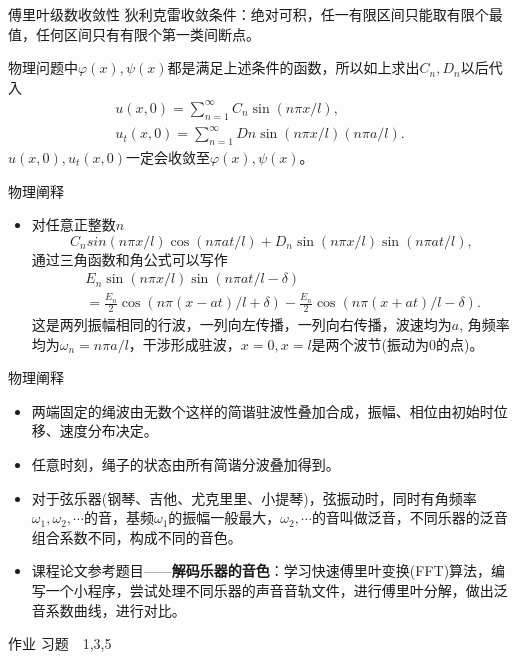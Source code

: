 \documentclass[11pt]{beamer}
\newcommand{\kong}[1][0.5]{\vspace{#1cm}}
\begin{document}
\begin{frame}{傅里叶级数收敛性}
狄利克雷收敛条件：绝对可积，任一有限区间只能取有限个最值，任何区间只有有限个第一类间断点。

\kong[1]
物理问题中$\varphi(x), \psi(x)$都是满足上述条件的函数，所以如上求出$C_n,D_n$以后代入
\begin{eqnarray}
u(x,0) = \sum^\infty_{n=1} C_n \sin(n\pi x/l), \\
u_t(x,0) = \sum^\infty_{n=1} Dn \sin(n\pi x/l) (n\pi a/l).
\end{eqnarray}
$u(x,0), u_t(x,0)$一定会收敛至$\varphi(x), \psi(x)$。
\end{frame}

\begin{frame}{物理阐释}
\begin{itemize}
\item 对任意正整数$n$
\begin{equation}
C_n sin(n\pi x/l)\cos (n\pi at/l) + D_n \sin(n\pi x/l) \sin( n\pi at/l),
\end{equation}
通过三角函数和角公式可以写作
\begin{eqnarray}
&& E_n \sin( n\pi x/l ) \sin( n\pi at/l - \delta)  \\
&& = \frac{E_n}{2}\cos( n\pi (x-at)/l + \delta )
- \frac{E_n}{2}\cos( n\pi (x+at)/l - \delta ).\nonumber
\end{eqnarray}
这是两列振幅相同的行波，一列向左传播，一列向右传播，波速均为$a$, 角频率均为$\omega_n = n\pi a/l$，干涉形成驻波，$x=0,x=l$是两个波节(振动为0的点)。
\end{itemize}
\end{frame}

\begin{frame}{物理阐释}
\begin{itemize}
\item 两端固定的绳波由无数个这样的简谐驻波性叠加合成，振幅、相位由初始时位移、速度分布决定。
\item 任意时刻，绳子的状态由所有简谐分波叠加得到。
\item 对于弦乐器(钢琴、吉他、尤克里里、小提琴)，弦振动时，同时有角频率$\omega_1, \omega_2, \cdots$的音，基频$\omega_1$的振幅一般最大，$\omega_2, \cdots$的音叫做泛音，不同乐器的泛音组合系数不同，构成不同的音色。
\item 课程论文参考题目——{\bf 解码乐器的音色}：学习快速傅里叶变换(FFT)算法，编写一个小程序，尝试处理不同乐器的声音音轨文件，进行傅里叶分解，做出泛音系数曲线，进行对比。
\end{itemize}
\end{frame}

\begin{frame}{作业}
习题　1,3,5
\end{frame}
\end{document}
